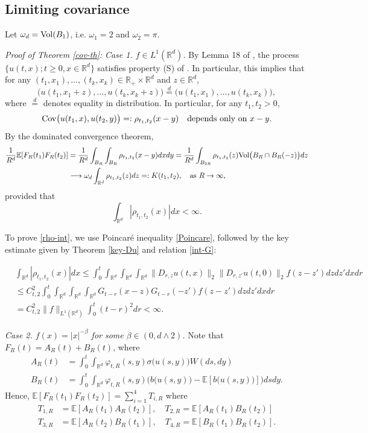 \documentclass[12pt]{article}
\def\bE{\mathbb{E}}
\def\bR{\mathbb{R}}
\begin{document}
\subsection{Limiting covariance}

Let $\omega_d={\rm Vol}(B_1)$, i.e. $\omega_1=2$ and $\omega_2=\pi$.

\medskip

{\em Proof of Theorem \ref{cov-th}:} {\em Case 1. $f \in L^1(\bR^d)$.} By Lemma 18 of \cite{dalang99}, the process $\{u(t,x);t\geq 0,x\in \bR^d\}$ satisfies property (S) of \cite{dalang99}. In particular, this implies that for any $(t_1,x_1),\ldots,(t_k,x_k) \in  \bR_{+} \times \bR^d$ and $z \in \bR^d$,
\[
\big(u(t_1,x_1+z),\ldots,u(t_k,x_k+z)\big) \stackrel{d}{=} \big(u(t_1,x_1),\ldots,u(t_k,x_k)\big),
\]
where $\stackrel{d}{=}$ denotes equality in distribution. In particular, for any $t_1,t_2>0$,
\[
{\rm Cov}\big(u(t_1,x),u(t_2,y)\big)=:\rho_{t_1,t_2}(x-y) \quad \mbox{depends only on $x-y$}.
\]
By the dominated convergence theorem,
\begin{align*}
\frac{1}{R^{d}}\bE[F_R(t_1)F_R(t_2)] & =\frac{1}{R^{d}}\int_{B_R} \int_{B_R} \rho_{t_1,t_2}(x-y)dxdy=\frac{1}{R^{d}} \int_{B_{2R}} \rho_{t_1,t_2}(z) {\rm Vol} \big(B_R \cap B_R(-z)\big)dz \\
& \longrightarrow \omega_{d} \int_{\bR^d} \rho_{t_1,t_2}(z) dz=:K(t_1,t_2), \quad \mbox{as} \ R \to \infty,
\end{align*}
provided that 
\begin{equation}
\label{rho-int}
\int_{\bR^d} | \rho_{t_1,t_2}(x)| dx<\infty.
\end{equation}


To prove \eqref{rho-int}, we use Poincar\'e inequality \eqref{Poincare}, followed by the key estimate given by Theorem \ref{key-Du} and relation \eqref{int-G}:

\begin{align*}
& \int_{\bR^d}| \rho_{t_1,t_2}(x)| dx \leq \int_0^t \int_{\bR^d} \int_{\bR^d} \int_{\bR^d}  \|D_{r,z}u(t,x)\|_2 \|D_{r,z'}u(t,0)\|_2 f(z-z') dzdz'dx dr \\
& \leq C_{t,2}^2 \int_0^t \int_{\bR^d} \int_{\bR^d} \int_{\bR^d} G_{t-r}(x-z) G_{t-r}(-z') f(z-z') dzdz'dx dr\\
& = C_{t,2}^2\|f\|_{L^1(\bR^d)} \int_0^t (t-r)^2 dr<\infty.
\end{align*}


{\em Case 2. $f(x)=|x|^{-\beta}$ for some $\beta \in (0,d\wedge 2)$.}
Note that $F_R(t)=A_R(t)+B_R(t)$, where 
\begin{align*}
A_R(t) & =\int_0^t \int_{\bR^d} \varphi_{t,R}(s,y) \sigma \big( u(s,y)\big) W(ds,dy)\\
B_R(t) & = \int_0^t \int_{\bR^d} \varphi_{t,R}(s,y)\Big(b\big( u(s,y)\big)-\bE[b\big(u(s,y)\big)] \Big) dsdy.
\end{align*}
Hence, $\bE[F_{R}(t_1)F_R(t_2)]=\sum_{i=1}^4 T_{i,R}$ where
\begin{align*}
T_{1,R} &=\bE[A_{R}(t_1) A_{R}(t_2)], \quad T_{2,R}=\bE[A_R(t_1) B_R(t_2)] \\
T_{3,R} & =\bE[A_R(t_2) B_R(t_1)], \quad  T_{4,R}=\bE[B_R(t_1) B_R(t_2)].
\end{align*}
\end{document}
